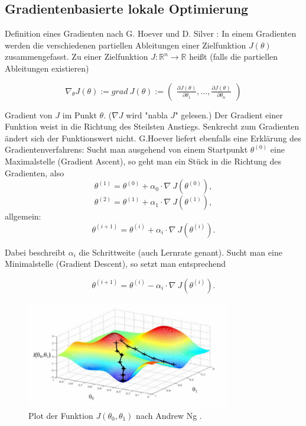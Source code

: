 \documentclass[conference]{IEEEtran}
\begin{document}
\subsection{Gradientenbasierte lokale Optimierung}
Definition eines Gradienten nach G. Hoever \cite[vgl. S. 213]{hoever_14} und D. Silver \cite{silver_15}: In einem Gradienten werden die verschiedenen partiellen Ableitungen einer Zielfunktion $J(\theta)$ zusammengefasst. Zu einer Zielfunktion $J : \mathbb{R}^n \rightarrow \mathbb{R}$ heißt (falls die partiellen Ableitungen existieren)

\begin{equation*}
\nabla_\theta J(\theta) := grad \: J(\theta) := \begin{pmatrix}
\frac{\partial J(\theta)}{\partial \theta_1}, \hdots, \frac{\partial J(\theta)}{\partial \theta_n}
\end{pmatrix}
\end{equation*}

Gradient von $J$ im Punkt $\theta$. ($\nabla J$ wird "nabla $J$" gelesen.) Der Gradient einer Funktion weist in die Richtung des Steilsten Anstiegs. Senkrecht zum Gradienten ändert sich der Funktionswert nicht. G.Hoever \cite[vgl. S. 214]{hoever_14} liefert ebenfalls eine Erklärung des Gradientenverfahrens: Sucht man ausgehend von einem Startpunkt $\theta^{(0)}$ eine Maximalstelle (Gradient Ascent), so geht man ein Stück in die Richtung des Gradienten, also
\begin{equation*}
\theta^{(1)} = \theta^{(0)} + \alpha_0 \cdot \nabla \: J(\theta^{(0)}),
\end{equation*}
\begin{equation*}
\theta^{(2)} = \theta^{(1)} + \alpha_1 \cdot \nabla \: J(\theta^{(1)}),
\end{equation*}
allgemein:
\begin{equation*}
\theta^{(i+1)} = \theta^{(i)} + \alpha_i \cdot \nabla \: J(\theta^{(i)}).
\end{equation*}

Dabei beschreibt $\alpha_i$ die Schrittweite (auch Lernrate genant). Sucht man eine Minimalstelle (Gradient Descent), so setzt man entsprechend 

\begin{equation*}
\theta^{(i+1)} = \theta^{(i)} - \alpha_i \cdot \nabla \: J(\theta^{(i)}).
\end{equation*}

\begin{figure}[!t]
\centering
\includegraphics[width=3.5in]{gradient_descent}
\caption{Plot der Funktion $J(\theta_0, \theta_1)$ nach Andrew Ng \cite{andrew_ng_17}.}
\label{gradient_descent}
\end{figure}
\end{document}
